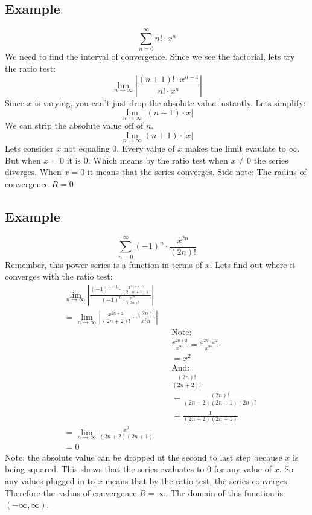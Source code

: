 \documentclass{report}
\begin{document}
    \subsection{Example}
        \[\sum_{n=0}^{\infty} n! \cdot x^n \]
        We need to find the interval of convergence.
        Since we see the factorial, lets try the ratio test:
        \[\lim_{n \to \infty} \left| \frac{(n+1)!\cdot x^{n-1}}{n! \cdot x^n}\right|\]
        Since \(x\) is varying, you can't just drop the absolute value instantly.
        Lets simplify:
        \[\lim_{n \to \infty} \left| (n+1) \cdot x\right|\]
        We can strip the absolute value off of \(n\).
        \[\lim_{n \to \infty} (n+1) \cdot |x| \]
        Lets consider \(x\) not equaling 0. 
        Every value of \(x\) makes the limit evaulate to \(\infty\).
        But when \(x = 0\) it is 0.
        Which means by the ratio test when \(x \neq 0\) the series diverges.
        When \(x = 0\) it means that the series converges.
        Side note: The radius of convergence \(R = 0\) 
    
    \subsection{Example}
        \[\sum_{n=0}^{\infty}  (-1)^n \cdot \frac{x^{2n}}{(2n)!}\]
        Remember, this power series is a function in terms of \(x\).
        Lets find out where it converges with the ratio test:
        \begin{align*}
            &\lim_{n \to \infty} \left| \frac{(-1)^{n+1} \cdot \frac{x^{2(n+1)}}{(2(n+1))!}}{(-1)^n \cdot \frac{x^{2n}}{(2n)!}}\right| \\
            &= \lim_{n \to \infty}  \left| \frac{x^{2n+2}}{(2n+2)!} \cdot \frac{(2n)!}{x^2n}\right| \\
            && & \text{Note:} \\
            && & \frac{x^{2n+2}}{x^{2n}} = \frac{x^{2n} \cdot x^2}{x^{2n}} \\
            && &= x^2 \\
            && & \text{And:} \\
            && & \frac{(2n)!}{(2n + 2)!} \\
            && &= \frac{(2n)!}{(2n+2)(2n+1)(2n)!} \\
            && &= \frac{1}{(2n+2)(2n+1)} \\
            &= \lim_{n \to \infty} \frac{x^2}{(2n+2)(2n+1)} \\
            &= 0
        \end{align*}
        Note: the absolute value can be dropped at the second to last step because \(x\) is being squared.
        This shows that the series evaluates to 0 for any value of \(x\).
        So any values plugged in to \(x\) means that by the ratio test, the series converges.
        Therefore the radius of convergence \(R = \infty\).
        The domain of this function is \((-\infty, \infty)\).
        
\end{document}
